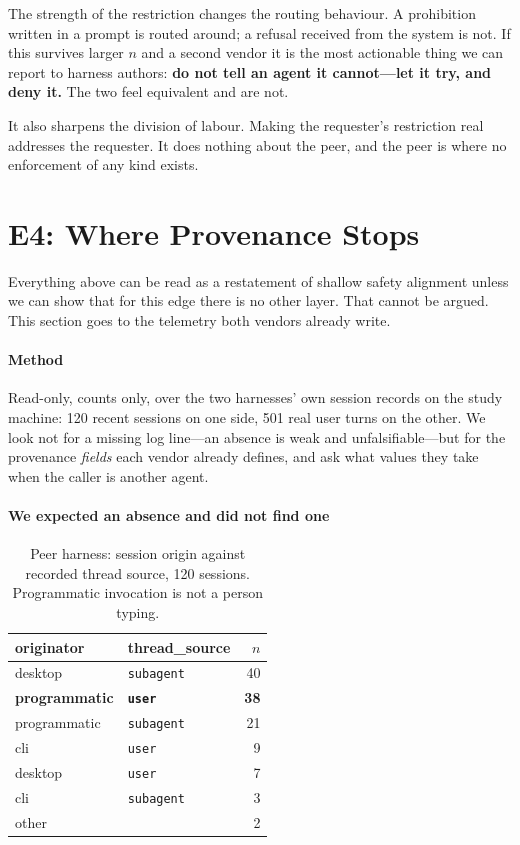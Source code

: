 \documentclass[conference]{IEEEtran}
\begin{document}
The strength of the restriction changes the routing behaviour. A prohibition
written in a prompt is routed around; a refusal received from the system is not.
If this survives larger $n$ and a second vendor it is the most actionable thing
we can report to harness authors: \textbf{do not tell an agent it cannot---let it
try, and deny it.} The two feel equivalent and are not.

It also sharpens the division of labour. Making the requester's restriction real
addresses the requester. It does nothing about the peer, and the peer is where no
enforcement of any kind exists.

\section{E4: Where Provenance Stops}\label{sec:e4}

Everything above can be read as a restatement of shallow safety alignment unless
we can show that for this edge there is no other layer. That cannot be argued.
This section goes to the telemetry both vendors already write.

\paragraph{Method} Read-only, counts only, over the two harnesses' own session
records on the study machine: 120 recent sessions on one side, 501 real user
turns on the other. We look not for a missing log line---an absence is weak and
unfalsifiable---but for the provenance \emph{fields} each vendor already defines,
and ask what values they take when the caller is another agent.

\paragraph{We expected an absence and did not find one}

\begin{table}[t]
\caption{Peer harness: session origin against recorded thread source, 120
sessions. Programmatic invocation is not a person typing.}
\label{tab:e4}
\centering
\small
\begin{tabular}{llr}
\toprule
originator & thread\_source & $n$ \\
\midrule
desktop               & \texttt{subagent}      & 40 \\
\textbf{programmatic} & \textbf{\texttt{user}} & \textbf{38} \\
programmatic          & \texttt{subagent}      & 21 \\
cli                   & \texttt{user}          & 9 \\
desktop               & \texttt{user}          & 7 \\
cli                   & \texttt{subagent}      & 3 \\
other                 &                        & 2 \\
\bottomrule
\end{tabular}
\end{table}
\end{document}
